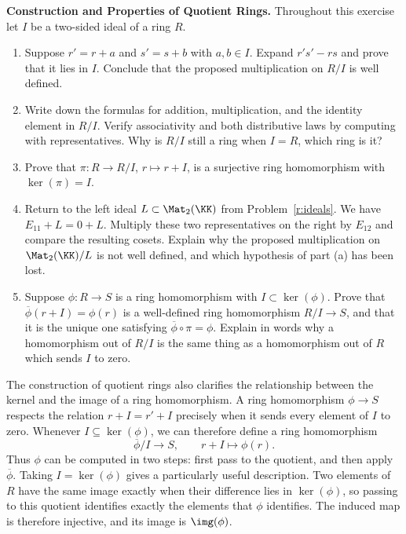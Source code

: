 \documentclass[12pt,reqno]{amsart}
\begin{document}
\hrulefill
 
\begin{problems}
\item\label{r:quotient} \textbf{Construction and Properties of Quotient Rings.} Throughout this exercise let $I$ be a two-sided ideal of a ring $R$.
\begin{enumerate}
\item Suppose $r'=r+a$ and $s'=s+b$ with $a,b\in I$. Expand $r's'-rs$ and prove that it lies in $I$. Conclude that the proposed multiplication on $R/I$ is well defined.
\item Write down the formulas for addition, multiplication, and the identity element in $R/I$. Verify associativity and both distributive laws by computing with representatives. Why is $R/I$ still a ring when $I=R$, which ring is it?
\item Prove that $\pi:R\to R/I$, $r\mapsto r+I$, is a surjective ring homomorphism with $\ker(\pi)=I$.
\item Return to the left ideal $L\subset \Mat_2(\KK)$ from Problem~\ref{r:ideals}. We have $E_{11}+L=0+L$. Multiply these two representatives on the right by $E_{12}$ and compare the resulting cosets. Explain why the proposed multiplication on $\Mat_2(\KK)/L$ is not well defined, and which hypothesis of part (a) has been lost.
\item Suppose $\phi:R\to S$ is a ring homomorphism with $I\subset\ker(\phi)$. Prove that $\overline\phi(r+I)=\phi(r)$ is a well-defined ring homomorphism $R/I\to S$, and that it is the unique one satisfying $\overline\phi\circ\pi=\phi$. Explain in words why a homomorphism out of $R/I$ is the same thing as a homomorphism out of $R$ which sends $I$ to zero.
\end{enumerate}
\end{problems}
 
\hrulefill
 
The construction of quotient rings also clarifies the relationship between the kernel and the image of a ring homomorphism. A ring homomorphism $\phi\to S$ respects the relation $r+I=r'+I$ precisely when it sends every element of $I$ to zero. Whenever $I\subseteq\ker(\phi)$, we can therefore define a ring homomorphism
\[
\overline{\phi}/I\longrightarrow S,
\qquad
r+I\longmapsto\phi(r).
\]
Thus $\phi$ can be computed in two steps: first pass to the quotient, and then apply $\overline{\phi}$. Taking $I=\ker(\phi)$ gives a particularly useful description. Two elements of $R$ have the same image exactly when their difference lies in $\ker(\phi)$, so passing to this quotient identifies exactly the elements that $\phi$ identifies. The induced map is therefore injective, and its image is $\img(\phi)$.
\end{document}

